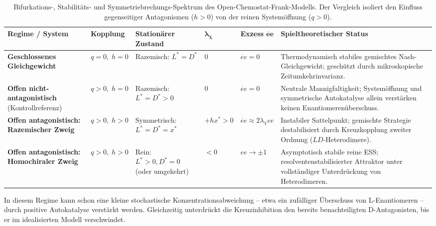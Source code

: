 \documentclass[12pt,a4paper]{article}
\theoremstyle{remark}
\begin{document}
\begin{table}[htbp]
\centering
\caption{Bifurkations-, Stabilitäts- und Symmetriebrechungs-Spektrum des Open-Chemostat-Frank-Modells. Der Vergleich isoliert den Einfluss gegenseitiger Antagonismen ($h > 0$) von der reinen Systemöffnung ($q > 0$).}
\label{tab:frank-bifurcation-spectrum}
\scriptsize
\setlength{\tabcolsep}{3pt}
\begin{tabularx}{\textwidth}{@{}>{\RaggedRight\arraybackslash}p{}>{\RaggedRight\arraybackslash}p{}>{\RaggedRight\arraybackslash}p{}>{\RaggedRight\arraybackslash}p{}>{\RaggedRight\arraybackslash}p{}>{\RaggedRight\arraybackslash}X@{}}
\toprule
\textbf{Regime / System} & \textbf{Kopplung} & \textbf{Stationärer Zustand} & $\boldsymbol{\lambda_\chi}$ & \textbf{Exzess $\mathbf{\dot{ee}}$} & \textbf{Spieltheoretischer Status} \\
\midrule
\textbf{Geschlossenes Gleichgewicht} & $q = 0,\; h = 0$ & Razemisch: $L^* = D^*$ & $0$ & $\dot{ee} = 0$ & Thermodynamisch stabiles gemischtes Nash-Gleichgewicht; geschützt durch mikroskopische Zeitumkehrinvarianz. \\
\addlinespace
\textbf{Offen nicht-antagonistisch} (Kontrollreferenz) & $q > 0,\; h = 0$ & Razemisch: $L^* = D^* > 0$ & $0$ & $\dot{ee} = 0$ & Neutrale Mannigfaltigkeit; Systemöffnung und symmetrische Autokatalyse allein verstärken keinen Enantiomerenüberschuss. \\
\addlinespace
\textbf{Offen antagonistisch: Razemischer Zweig} & $q > 0,\; h > 0$ & Symmetrisch: $L^* = D^* = x^*$ & $+h x^* > 0$ & $\dot{ee} \approx 2\lambda_\chi ee$ & Instabiler Sattelpunkt; gemischte Strategie destabilisiert durch Kreuzkopplung zweiter Ordnung ($LD$-Heterodimere). \\
\addlinespace
\textbf{Offen antagonistisch: Homochiraler Zweig} & $q > 0,\; h > 0$ & Rein: $L^* > 0, D^* = 0$ (oder umgekehrt) & $< 0$ & $ee \to \pm 1$ & Asymptotisch stabile reine ESS; resolventenstabilisierter Attraktor unter vollständiger Unterdrückung von Heterodimeren. \\
\bottomrule
\end{tabularx}
\end{table}

In diesem Regime kann schon eine kleine stochastische Konzentrationsabweichung -- etwa ein zufälliger Überschuss von L-Enantiomeren -- durch positive Autokatalyse verstärkt werden. Gleichzeitig unterdrückt die Kreuzinhibition den bereits benachteiligten D-Antagonisten, bis er im idealisierten Modell verschwindet.
\end{document}

